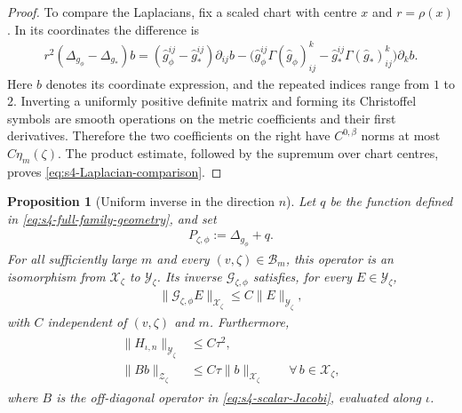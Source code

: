 \documentclass[a4paper,11pt,oneside,reqno]{amsart}
\numberwithin{equation}{section}
\newtheorem{proposition}[theorem]{Proposition}
\theoremstyle{definition}
\begin{document}
\begin{proof}
    To compare the Laplacians, fix a scaled chart with
    centre $x$ and $r=\rho(x)$. In its coordinates the
    difference is
    \begin{align*}
        r^2(\Delta_{g_\phi}-\Delta_{g_*})b
        =(\widehat g_\phi^{ij}-\widehat g_*^{ij})
        \partial_{ij}b-
        \bigl(\widehat g_\phi^{ij}
        \Gamma(\widehat g_\phi)^k_{ij}
        -\widehat g_*^{ij}\Gamma(\widehat g_*)^k_{ij}\bigr)
        \partial_kb.
    \end{align*}
    Here $b$ denotes its coordinate expression, and the
    repeated indices range from $1$ to $2$.
    Inverting a uniformly positive definite matrix and
    forming its Christoffel symbols are smooth operations
    on the metric coefficients and their first derivatives.
    Therefore the two coefficients on the right have
    $C^{0,\beta}$ norms at most $C\eta_m(\zeta)$.
    The product estimate, followed by the supremum over
    chart centres, proves
    \eqref{eq:s4-Laplacian-comparison}.
\end{proof}

\begin{proposition}[Uniform inverse in the direction $n$]
    \label{prop:s4-transverse-inverse}
    Let $q$ be the function defined in
    \eqref{eq:s4-full-family-geometry}, and set
    \begin{align}
        \label{eq:s4-P-definition}
        P_{\zeta,\phi}:=\Delta_{g_\phi}+q.
    \end{align}
    For all sufficiently large $m$ and every
    $(v,\zeta)\in\mathcal B_m$, this operator is an
    isomorphism from $\mathcal X_\zeta$ to
    $\mathcal Y_\zeta$. Its inverse
    $\mathscr G_{\zeta,\phi}$ satisfies, for every
    $E\in\mathcal Y_\zeta$,
    \begin{align}
        \label{eq:s4-actual-inverse}
        \|\mathscr G_{\zeta,\phi}E\|_{\mathcal X_\zeta}
        \leq C\|E\|_{\mathcal Y_\zeta},
    \end{align}
    with $C$ independent of $(v,\zeta)$ and $m$.
    Furthermore,
    \begin{align}
        \label{eq:s4-forcing-and-mixed}
        \begin{split}
            \|H_{\iota,n}\|_{\mathcal Y_\zeta}
            &\leq C\tau^2,\\
            \|Bb\|_{\mathcal Z_\zeta}
            &\leq C\tau\|b\|_{\mathcal X_\zeta}
            \qquad\forall\,b\in\mathcal X_\zeta,
        \end{split}
    \end{align}
    where $B$ is the off-diagonal operator in
    \eqref{eq:s4-scalar-Jacobi}, evaluated along $\iota$.
\end{proposition}
\end{document}
